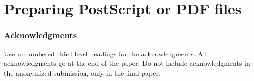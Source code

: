 \documentclass{article} %
\begin{document}
\section{Preparing PostScript or PDF files}

% 
% 


\subsubsection*{Acknowledgments}

Use unnumbered third level headings for the acknowledgments. All
acknowledgments go at the end of the paper. Do not include 
acknowledgments in the anonymized submission, only in the 
final paper. 



\end{document}
